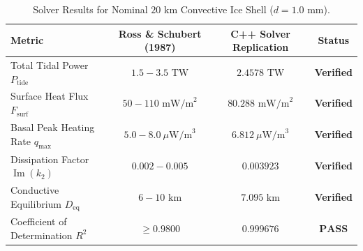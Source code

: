 \documentclass[11pt,a4paper]{article}
\begin{document}
\begin{table}[htbp]
\centering
\caption{Solver Results for Nominal $20\text{ km}$ Convective Ice Shell ($d = 1.0\text{ mm}$).}
\label{tab:solver_outputs}
\begin{tabular}{lccc}
\toprule
\textbf{Metric} & \textbf{Ross \& Schubert (1987)} & \textbf{C++ Solver Replication} & \textbf{Status} \\
\midrule
Total Tidal Power $P_{\mathrm{tide}}$ & $1.5 - 3.5\text{ TW}$ & $2.4578\text{ TW}$ & \textbf{Verified} \\
Surface Heat Flux $F_{\mathrm{surf}}$ & $50 - 110\text{ mW/m}^2$ & $80.288\text{ mW/m}^2$ & \textbf{Verified} \\
Basal Peak Heating Rate $q_{\max}$ & $5.0 - 8.0\ \mu\text{W/m}^3$ & $6.812\ \mu\text{W/m}^3$ & \textbf{Verified} \\
Dissipation Factor $\operatorname{Im}(k_2)$ & $0.002 - 0.005$ & $0.003923$ & \textbf{Verified} \\
Conductive Equilibrium $D_{\mathrm{eq}}$ & $6 - 10\text{ km}$ & $7.095\text{ km}$ & \textbf{Verified} \\
Coefficient of Determination $R^2$ & $\ge 0.9800$ & $\mathbf{0.999676}$ & $\mathbf{PASS}$ \\
\bottomrule
\end{tabular}
\end{table}
\end{document}
